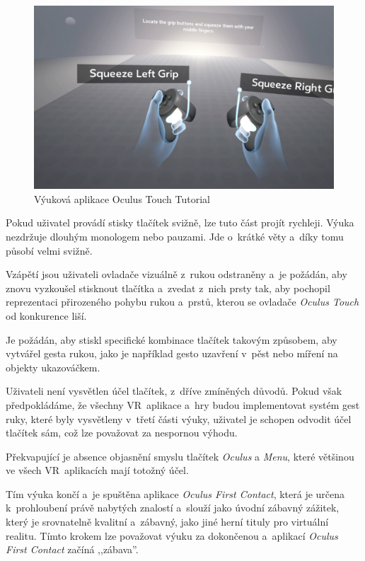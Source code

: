 \begin{figure}[h!]
\centering
\includegraphics[width=12cm]{src/assets/oculus-tutorial.png}
\caption{Výuková aplikace Oculus Touch Tutorial}
\end{figure}

Pokud uživatel provádí stisky tlačítek svižně, lze tuto část projít
rychleji. Výuka nezdržuje dlouhým monologem nebo pauzami. Jde o~krátké
věty a~díky tomu působí velmi svižně.

Vzápětí jsou uživateli ovladače vizuálně z~rukou odstraněny a~je
požádán, aby znovu vyzkoušel stisknout tlačítka a~zvedat z~nich prsty
tak, aby pochopil reprezentaci přirozeného pohybu rukou a~prstů, kterou
se ovladače \emph{Oculus Touch} od konkurence liší. 

Je požádán, aby
stiskl specifické kombinace tlačítek takovým způsobem, aby vytvářel
gesta rukou, jako je například gesto uzavření v~pěst nebo míření na
objekty ukazováčkem.

Uživateli není vysvětlen účel tlačítek, z~dříve zmíněných důvodů. Pokud
však předpokládáme, že všechny VR~aplikace a~hry budou implementovat
systém gest ruky, které byly vysvětleny v~třetí části výuky, uživatel je
schopen odvodit účel tlačítek sám, což lze považovat za nespornou
výhodu.

Překvapující je absence objasnění smyslu tlačítek \emph{Oculus} a
\emph{Menu}, které většinou ve všech VR~aplikacích mají totožný účel.

Tím výuka končí a~je spuštěna aplikace \emph{Oculus First Contact},
která je určena k~prohloubení právě nabytých znalostí a~slouží jako
úvodní zábavný zážitek, který je srovnatelně kvalitní a~zábavný, jako
jiné herní tituly pro virtuální realitu. Tímto krokem lze považovat výuku
za dokončenou a~aplikací \emph{Oculus First Contact} začíná
,,zábava''.

